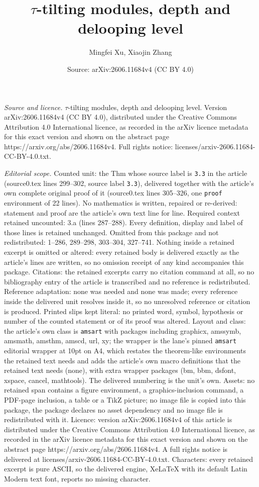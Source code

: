 \documentclass[10pt,a4paper]{amsart}
\title[$\tau$-tilting modules, depth and delooping level]{$\tau$-tilting modules, depth and delooping level}
\author{Mingfei Xu, Xiaojin Zhang}
\date{Source: arXiv:2606.11684v4 (CC BY 4.0)}
\begin{document}
\maketitle

\noindent\emph{Source and licence.} $\tau$-tilting modules, depth and delooping level. Version arXiv:2606.11684v4 (CC BY 4.0), distributed under the Creative Commons Attribution 4.0 International licence, as recorded in the arXiv licence metadata for this exact version and shown on the abstract page https://arxiv.org/abs/2606.11684v4. Full rights notice: licenses/arxiv-2606.11684-CC-BY-4.0.txt.\par\smallskip

\noindent\textit{Editorial scope.} Counted unit: the Thm whose source label is \texttt{3.3} in the article (source0.tex lines 299--302, source label \texttt{3.3}), delivered together with the article's own complete original proof of it (source0.tex lines 305--326, one \texttt{proof} environment of 22 lines). No mathematics is written, repaired or re-derived: statement and proof are the article's own text line for line. Required context retained uncounted: 3.a (lines 287--288). Every definition, display and label of those lines is retained unchanged. Omitted from this package and not redistributed: 1--286, 289--298, 303--304, 327--741. Nothing inside a retained excerpt is omitted or altered: every retained body is delivered exactly as the article's lines are written, so no omission receipt of any kind accompanies this package. Citations: the retained excerpts carry no citation command at all, so no bibliography entry of the article is transcribed and no reference is redistributed. Reference adaptation: none was needed and none was made; every reference inside the delivered unit resolves inside it, so no unresolved reference or citation is produced. Printed slips kept literal: no printed word, symbol, hypothesis or number of the counted statement or of its proof was altered. Layout and class: the article's own class is \texttt{amsart} with packages including graphicx, amssymb, amsmath, amsthm, amscd, url, xy; the wrapper is the lane's pinned \texttt{amsart} editorial wrapper at 10pt on A4, which restates the theorem-like environments the retained text needs and adds the article's own macro definitions that the retained text needs (none), with extra wrapper packages (bm, bbm, dsfont, xspace, cancel, mathtools). The delivered numbering is the unit's own. Assets: no retained span contains a figure environment, a graphics-inclusion command, a PDF-page inclusion, a table or a TikZ picture; no image file is copied into this package, the package declares no asset dependency and no image file is redistributed with it. Licence: version arXiv:2606.11684v4 of this article is distributed under the Creative Commons Attribution 4.0 International licence, as recorded in the arXiv licence metadata for this exact version and shown on the abstract page https://arxiv.org/abs/2606.11684v4. A full rights notice is delivered at licenses/arxiv-2606.11684-CC-BY-4.0.txt. Characters: every retained excerpt is pure ASCII, so the delivered engine, XeLaTeX with its default Latin Modern text font, reports no missing character.
\end{document}
